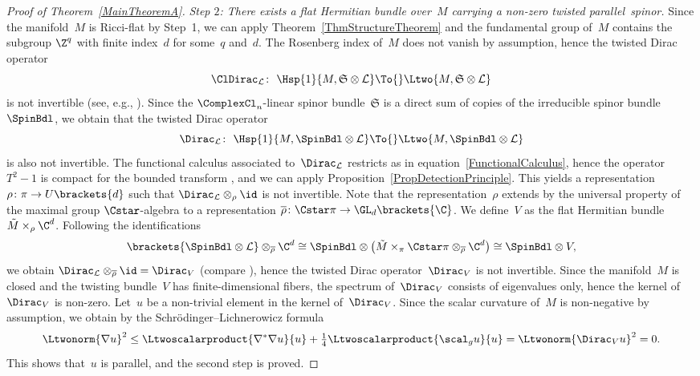 \documentclass[pdftex]{sigma}
\numberwithin{equation}{section}
\newcommand{\ClSpinBdl}{\mathfrak{S}}
\newcommand{\ClDL}{\ClDirac_{\mathcal{L}}}
\newcommand{\DL}{\Dirac_{\mathcal{L}}}
\begin{document}
\begin{proof}[Proof of Theorem~\ref{MainTheoremA}]
{\it Step $2$: There exists a flat Hermitian bundle over~$M$ carrying a non-zero twisted parallel~spinor.} %
Since the manifold~$M$ is Ricci-flat by Step~1, we can apply Theorem~\ref{ThmStructureTheorem} and the fundamental group of~$M$ contains the subgroup $\Z^q$ with finite index~$d$ for some~$q$ and~$d$. The Rosenberg index of~$M$ does not vanish by assumption, hence the twisted Dirac operator
\[
\ClDL\colon\ \Hsp{1}{M,\ClSpinBdl\otimes \mathcal{L}} \To{} \Ltwo{M,\ClSpinBdl\otimes \mathcal{L}}
\]
is not invertible (see, e.g., \cite[Lemma 2.4\,(ii)]{Tony2025}). Since the $\ComplexCl_n$-linear spinor bundle~$\ClSpinBdl$ is a direct sum of copies of the irreducible spinor bundle~$\SpinBdl$, we obtain that the twisted Dirac operator
\[
\DL\colon\ \Hsp{1}{M,\SpinBdl\otimes \mathcal{L}} \To{} \Ltwo{M,\SpinBdl\otimes \mathcal{L}}
\]
is also not invertible. The functional calculus associated to~$\DL$ restricts as in equation~\ref{FunctionalCalculus}, hence the operator $T^2-1$ is compact for the bounded transform \smash{$T\coloneqq \DL\brackets{\DL^2+1}^{-1/2}$}, and we can apply Proposition~\ref{PropDetectionPrinciple}. This yields a representation $\rho\colon \pi\to U\brackets{d}$ such that $\DL\otimes_{\rho} \id$ is not invertible. Note that the representation~$\rho$ extends by the universal property of the maximal group $\Cstar$-algebra to a representation $\overline{\rho}\colon \Cstar \pi \to \GL_d\brackets{\C}$. We define~$V$ as the flat Hermitian bundle $\tilde{M}\times_{\rho} \C ^d$. Following the identifications
\[
\brackets{\SpinBdl\otimes \mathcal{L}} \otimes_{\overline{\rho}} \C^d\cong\SpinBdl\otimes
\bigl(\tilde{M} \times_{\pi} \Cstar \pi \otimes_{\overline{\rho}} \C^d\bigr) \cong \SpinBdl \otimes V,
\]
we obtain $\DL\otimes_{\overline{\rho}} \id=\Dirac_V$ (compare \cite[Proposition~3.1]{Schick2021a}), hence the twisted Dirac operator~$\Dirac_V$ is not invertible. Since the manifold~$M$ is closed and the twisting bundle~$V$ has finite-dimensional fibers, the spectrum of~$\Dirac_V$ consists of eigenvalues only, hence the kernel of $\Dirac_V$ is non-zero. Let~$u$ be a non-trivial element in the kernel of~$\Dirac_V$. Since the scalar curvature of~$M$ is non-negative by assumption, we obtain by the Schr\"odinger--Lichnerowicz formula
\[
 \Ltwonorm{\nabla u}^2\leq \Ltwoscalarproduct{\nabla^*\nabla u}{u}+\tfrac{1}{4}\Ltwoscalarproduct{\scal_g u}{u}= \Ltwonorm{\Dirac_V u}^2=0.
\]
This shows that~$u$ is parallel, and the second step is proved.


\end{proof}
\end{document}
